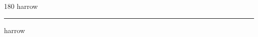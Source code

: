 
\begin{frame}
\begin{center}
\begin{turn}{180}
{\fontsize{2.5cm}{1em}\selectfont harrow}
\end{turn}
\vspace{1em}\par  
\hrule
\vspace{1em}\par  
{\fontsize{2.5cm}{1em}\selectfont harrow}
\end{center}
\end{frame}
